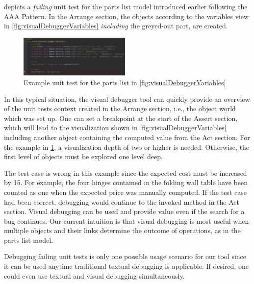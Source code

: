 \documentclass[conference]{IEEEtran}
\begin{document}
 depicts a \textit{failing} unit test for the parts list model introduced earlier following the AAA Pattern.
In the Arrange section, the objects according to the variables view in \cref{fig:visualDebuggerVariables} \textit{including} the greyed-out part, are created.

\begin{figure}[h]
    \centering
    \includegraphics[width=0.488\textwidth]{images/example.png}
    \caption{Example unit test for the parts list in \cref{fig:visualDebuggerVariables}}
    \label{fig:exampleUnitTest}
\end{figure}

In this typical situation, the visual debugger tool can quickly provide an overview of the unit tests context created in the Arrange section, i.e., the object world which was set up.
One can set a breakpoint at the start of the Assert section, which will lead to the visualization shown in \cref{fig:visualDebuggerVariables} including another object containing the computed value from the Act section.
For the example in \cref{fig:exampleUnitTest}, a visualization depth of two or higher is needed.
Otherwise, the first level of objects must be explored one level deep.

The test case is wrong in this example since the expected cost must be increased by 15.
For example, the four hinges contained in the folding wall table have been counted as one when the expected price was manually computed.
If the test case had been correct, debugging would continue to the invoked method in the Act section.
Visual debugging can be used and provide value even if the search for a bug continues.
Our current intuition is that visual debugging is most useful when multiple objects and their links determine the outcome of operations, as in the parts list model.

Debugging failing unit tests is only one possible usage scenario for our tool since it can be used anytime traditional textual debugging is applicable.
If desired, one could even use textual and visual debugging simultaneously.
\end{document}
